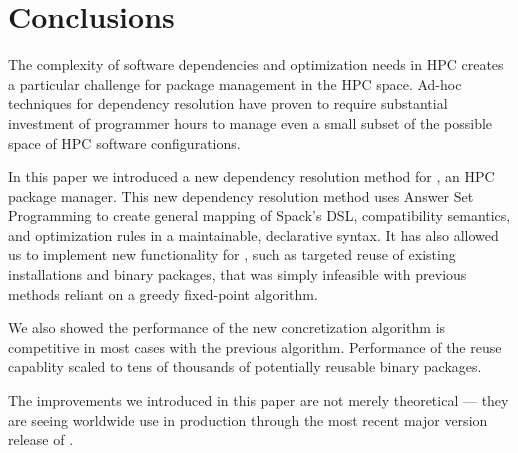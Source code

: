 \section{Conclusions}
\label{sec:conclusions}

The complexity of software dependencies and optimization needs in HPC creates a particular challenge for package management in the HPC space.
Ad-hoc techniques for dependency resolution have proven to require substantial investment of programmer hours to manage even a small subset of the possible space of HPC software configurations.

In this paper we introduced a new dependency resolution method for \spack{}, an HPC package manager.
This new dependency resolution method uses Answer Set Programming to create general mapping of Spack's DSL, compatibility semantics, and optimization rules in a maintainable, declarative syntax.
It has also allowed us to implement new functionality for \spack{}, such as targeted reuse of existing installations and binary packages, that was simply infeasible with previous methods reliant on a greedy fixed-point algorithm.

We also showed the performance of the new concretization algorithm is competitive in most cases with the previous algorithm.
Performance of the reuse capablity scaled to tens of thousands of potentially reusable binary packages.

The improvements we introduced in this paper are not merely theoretical --- they are seeing worldwide use in production through the most recent major version release of \spack{}.
